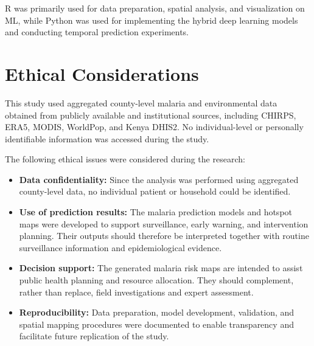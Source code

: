   R was primarily used for data preparation, spatial analysis, and visualization on ML, while Python was used for implementing the hybrid deep learning models and conducting temporal prediction experiments.

\section{Ethical Considerations}

This study used aggregated county-level malaria and environmental data obtained from publicly available and institutional sources, including CHIRPS, ERA5, MODIS, WorldPop, and Kenya DHIS2. No individual-level or personally identifiable information was accessed during the study.

The following ethical issues were considered during the research:

\begin{itemize}
	
	\item \textbf{Data confidentiality:} Since the analysis was performed using aggregated county-level data, no individual patient or household could be identified.
	
	\item \textbf{Use of prediction results:} The malaria prediction models and hotspot maps were developed to support surveillance, early warning, and intervention planning. Their outputs should therefore be interpreted together with routine surveillance information and epidemiological evidence.
	
	\item \textbf{Decision support:} The generated malaria risk maps are intended to assist public health planning and resource allocation. They should complement, rather than replace, field investigations and expert assessment.
	
	\item \textbf{Reproducibility:} Data preparation, model development, validation, and spatial mapping procedures were documented to enable transparency and facilitate future replication of the study.
	
\end{itemize}
